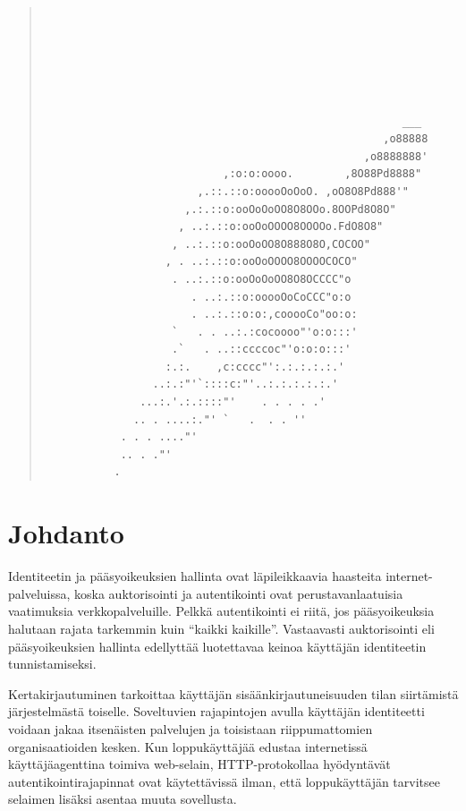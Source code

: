 \documentclass[finnish,gradu]{tktltiki}
\makeatletter
\newcommand{\gradutableofcontents}{%
  \tableofcontents
  \newpage
  \listoffigures
  \newpage
  \pagenumbering{arabic}
  \if@emptyfirstpagenumber
    \thispagestyle{empty}
  \fi
}
\makeatother
\begin{document}
\begin{abstract}
  \begin{singlespacing}
  \begin{verbatim}






                                                        ___
                                                     ,o88888
                                                  ,o8888888'
                            ,:o:o:oooo.        ,8O88Pd8888"
                        ,.::.::o:ooooOoOoO. ,oO8O8Pd888'"
                      ,.:.::o:ooOoOoOO8O8OOo.8OOPd8O8O"
                     , ..:.::o:ooOoOOOO8OOOOo.FdO8O8"
                    , ..:.::o:ooOoOO8O888O8O,COCOO"
                   , . ..:.::o:ooOoOOOO8OOOOCOCO"
                    . ..:.::o:ooOoOoOO8O8OCCCC"o
                       . ..:.::o:ooooOoCoCCC"o:o
                       . ..:.::o:o:,cooooCo"oo:o:
                    `   . . ..:.:cocoooo"'o:o:::'
                    .`   . ..::ccccoc"'o:o:o:::'
                   :.:.    ,c:cccc"':.:.:.:.:.'
                 ..:.:"'`::::c:"'..:.:.:.:.:.'
               ...:.'.:.::::"'    . . . . .'
              .. . ....:."' `   .  . . ''
            . . . ...."'
            .. . ."'
           .

  \end{verbatim}
  \end{singlespacing}
\end{abstract}

\setcounter{tocdepth}{3}
\gradutableofcontents

\section{Johdanto} %
\label{sec:johdanto}

  Identiteetin ja pääsyoikeuksien hallinta ovat läpileikkaavia haasteita internet-palveluissa, koska auktorisointi ja autentikointi ovat perustavanlaatuisia vaatimuksia verkkopalveluille. Pelkkä autentikointi ei riitä, jos pääsyoikeuksia halutaan rajata tarkemmin kuin ``kaikki kaikille''. Vastaavasti auktorisointi eli pääsyoikeuksien hallinta edellyttää luotettavaa keinoa käyttäjän identiteetin tunnistamiseksi.

  Kertakirjautuminen tarkoittaa käyttäjän sisäänkirjautuneisuuden tilan siirtämistä järjestelmästä toiselle. Soveltuvien rajapintojen avulla käyttäjän identiteetti voidaan jakaa itsenäisten palvelujen ja toisistaan riippumattomien organisaatioiden kesken. Kun loppukäyttäjää edustaa internetissä käyttäjäagenttina toimiva web-selain, HTTP-protokollaa hyödyntävät autentikointirajapinnat ovat käytettävissä ilman, että loppukäyttäjän tarvitsee selaimen lisäksi asentaa muuta sovellusta.
\end{document}
